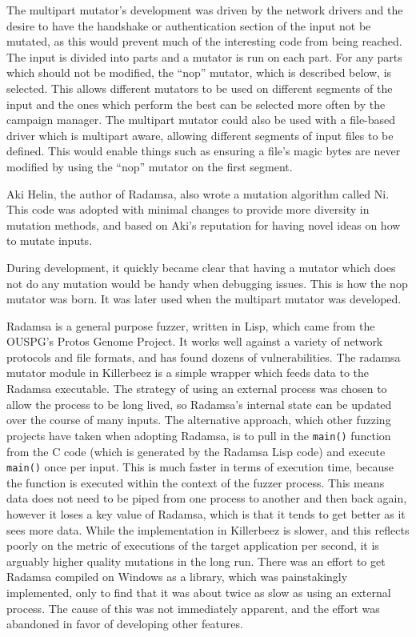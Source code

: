 The multipart mutator's development was driven by the network drivers and the desire to have
the handshake or authentication section of the input not be mutated, as this
would prevent much of the interesting code from being reached.  The input is
divided into parts and a mutator is run on each part. For any parts which
should not be modified, the ``nop'' mutator, which is described below, is
selected. This allows different mutators to be used on different segments of
the input and the ones which perform the best can be selected more often by the
campaign manager.  The multipart mutator could also be used with a file-based
driver which is multipart aware, allowing different segments of input files to
be defined.  This would enable things such as ensuring a file's magic bytes are
never modified by using the ``nop'' mutator on the first segment.

Aki Helin, the author of Radamsa, also wrote a mutation algorithm called Ni.
This code was adopted with minimal changes to provide more diversity in
mutation methods, and based on Aki's reputation for having novel ideas on how
to mutate inputs.

During development, it quickly became clear that having a mutator which does
not do any mutation would be handy when debugging issues.  This is how the nop
mutator was born. It was later used when the multipart mutator was developed.

Radamsa is a general purpose fuzzer, written in Lisp, which came from the
OUSPG's Protos Genome Project.\cite{genome} It works well against a variety of network
protocols and file formats, and has found dozens of vulnerabilities.  The
radamsa mutator module in Killerbeez is a simple wrapper which feeds data
to the Radamsa executable.  The strategy of using an external process was chosen
to allow the process to be long lived, so Radamsa's internal state can be
updated over the course of many inputs.  The alternative approach, which
other fuzzing projects have taken when adopting Radamsa, is to pull in the \texttt{main()}
function from the C code (which is generated by the Radamsa Lisp code) and
execute \texttt{main()} once per input.\cite{radamsatob}  This is much faster
in terms of execution time, because the function is executed within the context of the
fuzzer process.  This means data does not need to be piped from one process
to another and then back again, however it loses a key value of Radamsa, which
is that it tends to get better as it sees more data. While the implementation
in Killerbeez is slower, and this reflects poorly on the metric of executions
of the target application per second, it is arguably higher quality mutations
in the long run.  There was an effort to get Radamsa compiled on Windows as a
library, which was painstakingly implemented, only to find that it was about twice
as slow as using an external process. The cause of this was not immediately
apparent, and the effort was abandoned in favor of developing other features.

